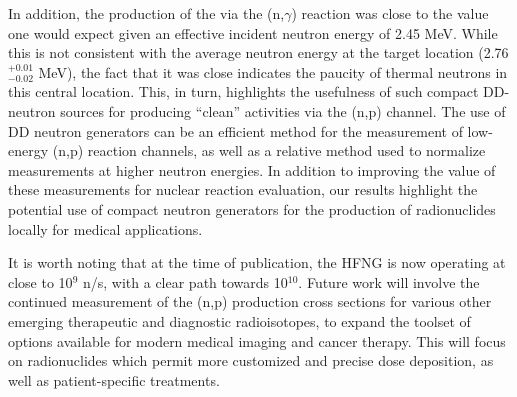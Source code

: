  In addition, the   production of the   via the (n,$\gamma$) reaction was close to the value one would expect given an effective incident neutron energy of 2.45 MeV.  
 While this is not consistent with the average neutron energy at the target location (2.76$^{+0.01}_{-0.02}$ MeV), the fact that it was close indicates the paucity of thermal neutrons in this central location.  
 This, in turn, highlights the usefulness of such compact DD-neutron sources  for producing \enquote{clean} activities via the (n,p) channel.  
The use of DD neutron generators can be an efficient method for the measurement of low-energy (n,p) reaction channels, as well as a relative method used to normalize measurements at higher neutron energies.
 In addition to improving the value of these measurements for nuclear reaction evaluation, our results highlight the potential use of compact neutron generators for the production of radionuclides locally for medical applications.


 It is worth noting that at the time of publication, the  HFNG is now operating at close to 10$^9$ n/s, with
a clear path towards 10$^{10}$.
 Future work will involve the continued measurement of the (n,p) production cross sections for various other emerging therapeutic and diagnostic radioisotopes, to expand the toolset of options available for modern medical imaging and cancer therapy.
This will focus on radionuclides which permit more customized and precise dose deposition, as well as patient-specific treatments.